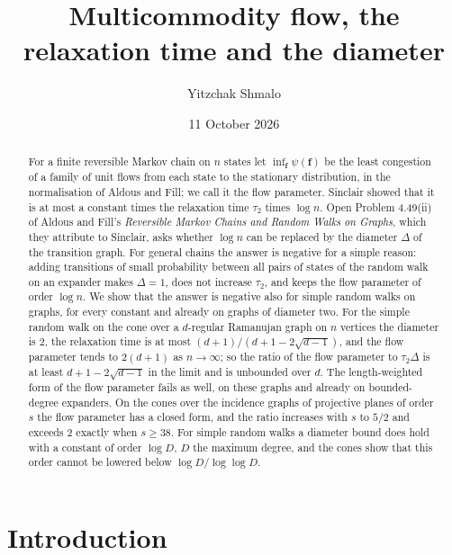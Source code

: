 \documentclass[11pt]{amsart}
\title[Multicommodity flow, the relaxation time and the diameter]{Multicommodity flow, the relaxation time and the diameter}
\author{Yitzchak Shmalo}
\date{11 October 2026}
\theoremstyle{definition}
\newcommand{\bfF}{\mathbf{f}}
\begin{document}
\begin{abstract}
For a finite reversible Markov chain on $n$ states let $\inf_{\bfF}\psi(\bfF)$ be the least congestion of a family of unit flows from each state to the stationary distribution, in the normalisation of Aldous and Fill; we call it the flow parameter. Sinclair showed that it is at most a constant times the relaxation time $\tau_2$ times $\log n$. Open Problem 4.49(ii) of Aldous and Fill's \emph{Reversible Markov Chains and Random Walks on Graphs}, which they attribute to Sinclair, asks whether $\log n$ can be replaced by the diameter $\Delta$ of the transition graph. For general chains the answer is negative for a simple reason: adding transitions of small probability between all pairs of states of the random walk on an expander makes $\Delta=1$, does not increase $\tau_2$, and keeps the flow parameter of order $\log n$. We show that the answer is negative also for simple random walks on graphs, for every constant and already on graphs of diameter two. For the simple random walk on the cone over a $d$-regular Ramanujan graph on $n$ vertices the diameter is $2$, the relaxation time is at most $(d+1)/(d+1-2\sqrt{d-1})$, and the flow parameter tends to $2(d+1)$ as $n\to\infty$; so the ratio of the flow parameter to $\tau_2\Delta$ is at least $d+1-2\sqrt{d-1}$ in the limit and is unbounded over $d$. The length-weighted form of the flow parameter fails as well, on these graphs and already on bounded-degree expanders. On the cones over the incidence graphs of projective planes of order $s$ the flow parameter has a closed form, and the ratio increases with $s$ to $5/2$ and exceeds $2$ exactly when $s\ge38$. For simple random walks a diameter bound does hold with a constant of order $\log D$, $D$ the maximum degree, and the cones show that this order cannot be lowered below $\log D/\log\log D$.
\end{abstract}

\maketitle

\section{Introduction}
\end{document}
